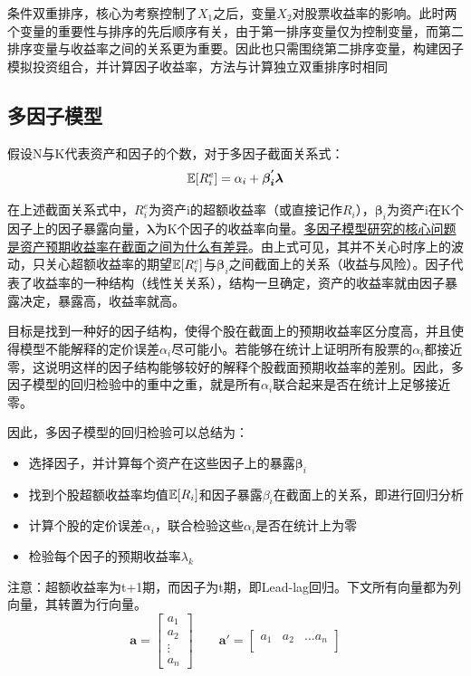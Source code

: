 \documentclass[11pt]{article}
\begin{document}
条件双重排序，核心为考察控制了$X_1$之后，变量$X_2$对股票收益率的影响。此时两个变量的重要性与排序的先后顺序有关，由于第一排序变量仅为控制变量，而第二排序变量与收益率之间的关系更为重要。因此也只需围绕第二排序变量，构建因子模拟投资组合，并计算因子收益率，方法与计算独立双重排序时相同

\subsection{多因子模型}

假设N与K代表资产和因子的个数，对于多因子截面关系式：
\begin{equation*}
    \mathbb{E}[R_{i}^{e}] = \alpha_i + \bm{\beta_{i}^{'} \lambda}
\end{equation*}

在上述截面关系式中，$R_{i}^{e}$为资产i的超额收益率（或直接记作$R_{i}$），$\bm{\beta}_i$为资产i在K个因子上的因子暴露向量，$\bm{\lambda}$为K个因子的收益率向量。\uline{多因子模型研究的核心问题是资产预期收益率在截面之间为什么有差异}。由上式可见，其并不关心时序上的波动，只关心超额收益率的期望$\mathbb{E}[R_{i}^{e}]$与$\bm{\beta}_i$之间截面上的关系（收益与风险）。因子代表了收益率的一种结构（线性关关系），结构一旦确定，资产的收益率就由因子暴露决定，暴露高，收益率就高。

目标是找到一种好的因子结构，使得个股在截面上的预期收益率区分度高，并且使得模型不能解释的定价误差$\alpha_i$尽可能小。若能够在统计上证明所有股票的$\alpha_i$都接近零，这说明这样的因子结构能够较好的解释个股截面预期收益率的差别。因此，多因子模型的回归检验中的重中之重，就是所有$\alpha_i$联合起来是否在统计上足够接近零。

因此，多因子模型的回归检验可以总结为：
\begin{itemize}
    \item 选择因子，并计算每个资产在这些因子上的暴露$\bm{\beta}_i$
    \item 找到个股超额收益率均值$\mathbb{E}[R_{i}]$和因子暴露$\beta_i$在截面上的关系，即进行回归分析
    \item 计算个股的定价误差$\alpha_i$，联合检验这些$\alpha_i$是否在统计上为零
    \item 检验每个因子的预期收益率$\lambda_k$
\end{itemize}

注意：超额收益率为t+1期，而因子为t期，即Lead-lag回归。下文所有向量都为列向量，其转置为行向量。
\begin{equation*}
    \bm{a} = \begin{bmatrix}
        a_1 \\
        a_2 \\
        \vdots \\
        a_n
    \end{bmatrix}
    \qquad
    \bm{a}' = \begin{bmatrix}
        a_1 & a_2 & \dots a_n \\
    \end{bmatrix}
\end{equation*}
\end{document}
